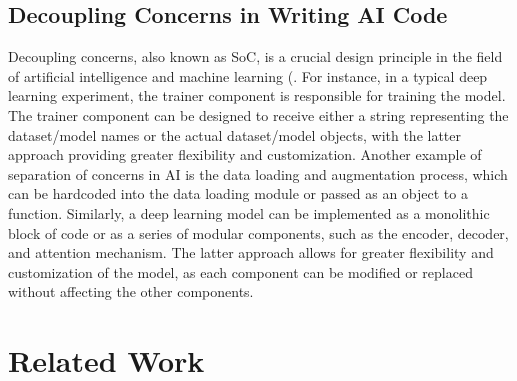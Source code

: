 \subsection{Decoupling Concerns in Writing AI Code}


Decoupling concerns, also known as SoC, is a crucial design principle in the field of artificial intelligence and machine learning (\cite{mo2016decoupling,qian2006decoupling, pressman2010software}. For instance, in a typical deep learning experiment, the trainer component is responsible for training the model. The trainer component can be designed to receive either a string representing the dataset/model names or the actual dataset/model objects, with the latter approach providing greater flexibility and customization. Another example of separation of concerns in AI is the data loading and augmentation process, which can be hardcoded into the data loading module or passed as an object to a function. Similarly, a deep learning model can be implemented as a monolithic block of code or as a series of modular components, such as the encoder, decoder, and attention mechanism. The latter approach allows for greater flexibility and customization of the model, as each component can be modified or replaced without affecting the other components.



\section{Related Work}



